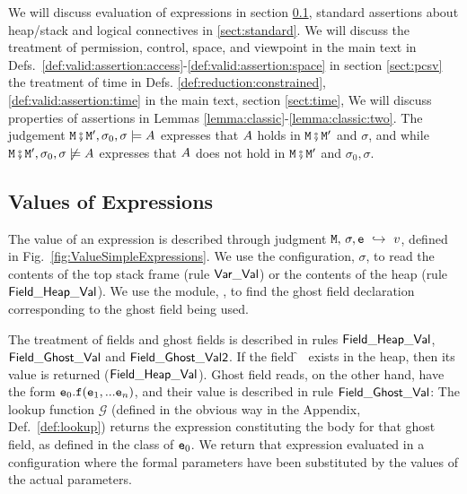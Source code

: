 We will discuss evaluation of expressions in section \ref{sect:expressions}, standard assertions about heap/stack and logical
 connectives in \ref{sect:standard}. 
 We will discuss the treatment of  permission, control, space, and viewpoint  in 
the main text in  Defs.~\ref{def:valid:assertion:access}-\ref{def:valid:assertion:space}  in section \ref{sect:pcsv} %
the treatment of time in Defs. \ref{def:reduction:constrained}, \ref{def:valid:assertion:time} in the main text, section \ref{sect:time},
We will discuss properties of assertions in Lemmas \ref{lemma:classic}-\ref{lemma:classic:two}.
 The judgement ${\mbox{\tt{\ensuremath{{\mbox{\tt{M}}}}}}}\fatsemi {\mbox{\tt{\ensuremath{{\mbox{\tt{M}}}}}}}', \sigma_0 ,  \sigma  \models A$ expresses that $A$ holds in  ${\mbox{\tt{\ensuremath{{\mbox{\tt{M}}}}}}}\fatsemi {\mbox{\tt{\ensuremath{{\mbox{\tt{M}}}}}}}'$ and $\sigma$, and 
while ${\mbox{\tt{\ensuremath{{\mbox{\tt{M}}}}}}}\fatsemi {\mbox{\tt{\ensuremath{{\mbox{\tt{M}}}}}}}', \sigma_0 , \sigma  \not\models A$  expresses that $A$ does not hold  in  ${\mbox{\tt{\ensuremath{{\mbox{\tt{M}}}}}}}\fatsemi {\mbox{\tt{\ensuremath{{\mbox{\tt{M}}}}}}}'$ and $\sigma_0,\sigma$.
 
\subsection{Values of Expressions}
\label{sect:expressions}

The value  of  an expression  is described through judgment $ {\mbox{\tt{\ensuremath{{\mbox{\tt{M}}}}}}},\, \sigma, {\mbox{\tt{e}}} \ \hookrightarrow\  v$,
defined in Fig.~\ref{fig:ValueSimpleExpressions}.
We use the configuration, $\sigma$, to read the contents of the top stack frame
(rule ${\sf {Var\_Val}}$) or the contents of the heap (rule
${\sf {Field\_Heap\_Val}}$). We use the module, \M, to find the  ghost field declaration corresponding to the
ghost field being used. 

The treatment of fields and ghost fields is described in rules ${\sf {Field\_Heap\_Val}}$,\\  ${\sf {Field\_Ghost\_Val}}$ and 
${\sf {Field\_Ghost\_Val2}}$.  If the field \f~ exists in the heap, then its value is returned (${\sf {Field\_Heap\_Val}}$). 
Ghost field reads, on the other hand, have the form ${\mbox{\tt{e}}}_0.{\mbox{\tt{f}}}({\mbox{\tt{e}}}_1,...{\mbox{\tt{e}}}_n)$, and their value is
described in rule ${\sf {Field\_Ghost\_Val}}$:
%
The lookup function $\mathcal G$  (defined in the obvious way in the Appendix, Def.~\ref{def:lookup})
returns the expression constituting the body for that ghost field, as defined in the class of ${\mbox{\tt{e}}}_0$.
We return  that expression
evaluated in a configuration where the formal parameters have been substituted by the values of the actual
parameters.

